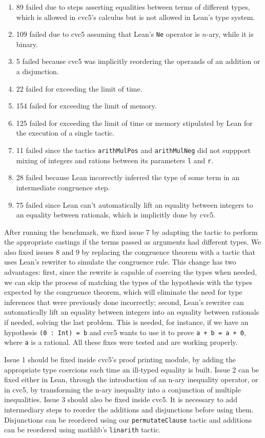 \begin{enumerate}
  \item 89 failed due to steps asserting equalities between terms of different types, which is allowed in cvc5's calculus but is not allowed in Lean's type system.
  \item 109 failed due to cvc5 assuming that Lean's \texttt{Ne} operator is $n$-ary, while it is binary.
  \item 5 failed because cvc5 was implicitly reordering the operands of an addition or a disjunction.
  \item 22 failed for exceeding the limit of time.
  \item 154 failed for exceeding the limit of memory.
  \item 125 failed for exceeding the limit of time or memory stipulated by Lean for the execution of a single tactic.
  \item 11 failed since the tactics \texttt{arithMulPos} and \texttt{arithMulNeg} did not suppport mixing of integers and rations between its parameters \texttt{l} and \texttt{r}.
  \item 28 failed because Lean incorrectly inferred the type of some term in an intermediate congruence step.
  \item 75 failed since Lean can't automatically lift an equality between integers to an equality between rationals, which is implicitly done by cvc5.
\end{enumerate}

After running the benchmark, we fixed issue 7 by adapting the tactic to perform the
appropriate castings if the terms passed as arguments had different types. We also
fixed issues 8 and 9 by replacing the congruence theorem with a tactic that uses
Lean's rewriter to simulate the congruence rule.
This change has two advantages: first, since the rewrite is
capable of coercing the types when needed, we can skip the process
of matching the types of the hypothesis with the types expected by the congruence theorem, which will
eliminate the need for type inferences that were previously done incorrectly; second, Lean's rewriter
can automatically lift an equality between integers into an equality between rationals if needed, solving
the last problem. This is needed, for instance, if we have an hypothesis \texttt{(0 : Int) = b}
and cvc5 wants to use it to prove \texttt{a + b = a + 0}, where \texttt{a}
is a rational. All these fixes were tested and are working properly.

Issue 1 should be fixed inside cvc5's proof printing module, by adding the appropriate type coercions
each time an ill-typed equality is built.
%
Issue 2 can be fixed either in Lean, through the introduction of an n-ary inequality operator,
or in cvc5, by transforming the n-ary inequality into a conjunction of multiple inequalities.
%
Issue 3 should also be fixed inside cvc5. It is necessary to add intermediary steps to reorder the
additions and disjunctions before using them. Disjunctions can be reordered using our \texttt{permutateClause}
tactic and additions can be reordered using mathlib's \texttt{linarith} tactic.

